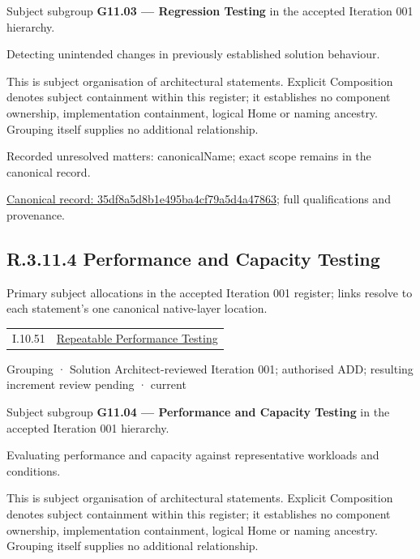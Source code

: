 Subject subgroup \textbf{G11.03 — Regression Testing} in the accepted Iteration 001 hierarchy.



Detecting unintended changes in previously established solution behaviour.



This is subject organisation of architectural statements. Explicit Composition denotes subject containment within this register; it establishes no component ownership, implementation containment, logical Home or naming ancestry. Grouping itself supplies no additional relationship.


{\small Recorded unresolved matters: canonicalName; exact scope remains in the canonical record.}\par
{\footnotesize \href{../../../../continuum/grouping/35df8a5d8b1e495ba4cf79a5d4a47863.md}{Canonical record: 35df8a5d8b1e495ba4cf79a5d4a47863}; full qualifications and provenance.}\par
\subsection*{R.3.11.4 Performance and Capacity Testing}
\label{navigation:R.3.11.4}

Primary subject allocations in the accepted Iteration 001 register; links resolve to each statement’s one canonical native-layer location.\par
\begin{longtable}{p{.22\linewidth}p{.73\linewidth}}
I.10.51 & \hyperref[element:1c2eb4d9aef4425288528907fed7ebc2]{Repeatable Performance Testing} \\
\end{longtable}
\label{element:cd453ee30502406db647a0c5b4011739}
{\small Grouping · Solution Architect-reviewed Iteration 001; authorised ADD; resulting increment review pending · current}\par

Subject subgroup \textbf{G11.04 — Performance and Capacity Testing} in the accepted Iteration 001 hierarchy.



Evaluating performance and capacity against representative workloads and conditions.



This is subject organisation of architectural statements. Explicit Composition denotes subject containment within this register; it establishes no component ownership, implementation containment, logical Home or naming ancestry. Grouping itself supplies no additional relationship.


